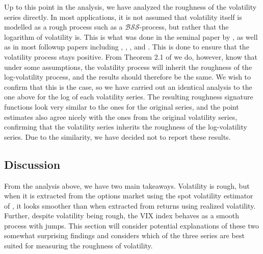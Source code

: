 \documentclass[fleqn,11pt,letterpaper]{article}
\theoremstyle{plain}
\theoremstyle{definition}
\theoremstyle{remark}
\numberwithin{equation}{section}
\begin{document}
Up to this point in the analysis, we have analyzed the roughness of the volatility series directly. In most applications, it is not assumed that volatility itself is modelled as a rough process such as a $\mathcal{BSS}$-process, but rather that the logarithm of volatility is. This is what was done in the seminal paper by \cite{Gatheral2018}, as well as in most followup papers including \cite{Bayer2016a}, \cite{Bennedsen2021}, \cite{BCSV2020}, and \cite{BennedsenEtAl2023}. This is done to ensure that the volatility process stays positive. From Theorem 2.1 of \cite{Bennedsen2021} we do, however, know that under some assumptions, the volatility process will inherit the roughness of the log-volatility process, and the results should therefore be the same. We wish to confirm that this is the case, so we have carried out an identical analysis to the one above for the log of each volatility series. The resulting roughness signature functions look very similar to the ones for the original series, and the point estimates also agree nicely with the ones from the original volatility series, confirming that the volatility series inherits the roughness of the log-volatility series. Due to the similarity, we have decided not to report these results. 

\subsection{Discussion}\label{section:discussion}

From the analysis above, we have two main takeaways. Volatility is rough, but when it is extracted from the options market using the spot volatility estimator of \cite{Todorov2019}, it looks smoother than when extracted from returns using realized volatility. Further, despite volatility being rough, the VIX index behaves as a smooth process with jumps. This section will consider potential explanations of these two somewhat surprising findings and considers which of the three series are best suited for measuring the roughness of volatility. 
\end{document}
